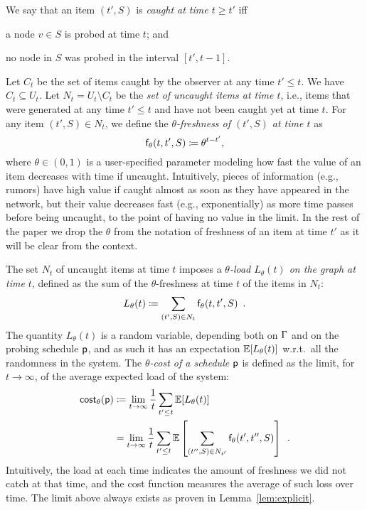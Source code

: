 We say that an item $(t',S)$ is \emph{caught at time $t\ge t'$} iff
\begin{enumerate*}
	\item a node $v\in S$ is probed at time $t$; and
	\item no node in $S$ was probed in the interval $[t',t-1]$.
\end{enumerate*}

Let $C_t$ be the set of items caught by the observer at any time $t'\le t$. We
have $C_t\subseteq U_t$. Let $N_t= U_t\setminus C_t$ be the \emph{set of
uncaught items at time $t$}, i.e., items that were generated at any time
$t'\le t$ and have not been caught yet at time $t$. For any item $(t',S)\in
N_t$, we define the \emph{$\theta$-freshness of $(t',S)$ at time $t$} as
\[
	\mathsf{f}_\theta(t,t',S)\coloneqq\theta^{t-t'},
\]
where $\theta\in(0,1)$ is a user-specified parameter modeling how fast the
value of an item decreases with time if uncaught. Intuitively, pieces of
information (e.g., rumors) have high value if caught almost as soon as they have
appeared in the network, but their value decreases fast (e.g., exponentially) as
more time passes before being uncaught, to the point of having no value in the
limit. In the rest of the paper we drop the $\theta$ from the notation of
freshness of an item at time $t'$ as it will be clear from the context.

 The set $N_t$ of uncaught items
at time $t$ imposes a \emph{$\theta$-load $L_\theta(t)$ on the graph at time
$t$}, defined as the sum of the $\theta$-freshness at time $t$ of the items in
$N_t$:
\[
	L_\theta(t)\coloneqq\sum_{(t',S)\in N_t} \mathsf{f}_\theta(t,t',S)\enspace.
\]
The quantity $L_\theta(t)$ is a random variable, depending both on $\Gamma$ and on
the probing schedule $\mathsf{p}$, and as such it has an expectation
$\mathbb{E}[L_\theta(t)]$ w.r.t.~all the randomness in the system. The
\emph{$\theta$-cost of a schedule $\mathsf{p}$} is defined as the limit, for
$t\rightarrow\infty$, of the average expected load of the system:
\begin{align*}
	\mathsf{cost}_\theta(\mathsf{p})&\coloneqq\lim_{t\rightarrow\infty}\frac{1}{t}\sum_{t'\le
	t}\mathbb{E}[L_\theta(t)]\\
	&=\lim_{t\rightarrow\infty}\frac{1}{t}\sum_{t'\le
	t}\mathbb{E}\left[\sum_{(t'',S)\in N_{t'}}\mathsf{f}_\theta(t',t'',S)\right]\enspace.
\end{align*}
Intuitively, the load at each time indicates the amount of freshness we did not
catch at that time, and the cost function measures the average of such loss over
time. The limit above always exists as proven in Lemma~\ref{lem:explicit}.

